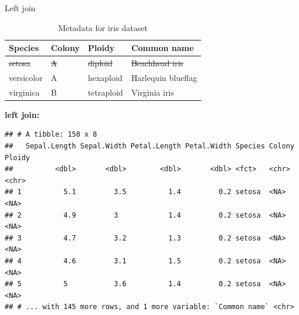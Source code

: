 \documentclass[14pt,ignorenonframetext,]{bredelebeamer}
\newenvironment{Shaded}{\begin{snugshade}}{\end{snugshade}}
\newcommand{\KeywordTok}[1]{\textcolor[rgb]{0.94,0.87,0.69}{#1}}
\newcommand{\DataTypeTok}[1]{\textcolor[rgb]{0.87,0.87,0.75}{#1}}
\newcommand{\DecValTok}[1]{\textcolor[rgb]{0.86,0.86,0.80}{#1}}
\newcommand{\StringTok}[1]{\textcolor[rgb]{0.80,0.58,0.58}{#1}}
\newcommand{\OperatorTok}[1]{\textcolor[rgb]{0.94,0.94,0.82}{#1}}
\newcommand{\NormalTok}[1]{\textcolor[rgb]{0.80,0.80,0.80}{#1}}
\begin{document}
\begin{frame}[fragile]{Left join}

\begin{table}[t]

\caption{\label{tab:unnamed-chunk-47}Metadata for iris dataset}
\centering
\begin{tabular}{llll}
\toprule
Species & Colony & Ploidy & Common name\\
\midrule
\rowcolor{gray!6}  \sout{setosa} & \sout{A} & \sout{diploid} & \sout{Beachhead iris}\\
versicolor & A & hexaploid & Harlequin blueflag\\
\rowcolor{gray!6}  virginica & B & tetraploid & Virginia iris\\
\bottomrule
\end{tabular}
\end{table}

\textbf{left join:}

\begin{Shaded}
\end{Shaded}

\begin{verbatim}
## # A tibble: 150 x 8
##   Sepal.Length Sepal.Width Petal.Length Petal.Width Species Colony Ploidy
##          <dbl>       <dbl>        <dbl>       <dbl> <fct>   <chr>  <chr> 
## 1          5.1         3.5          1.4         0.2 setosa  <NA>   <NA>  
## 2          4.9         3            1.4         0.2 setosa  <NA>   <NA>  
## 3          4.7         3.2          1.3         0.2 setosa  <NA>   <NA>  
## 4          4.6         3.1          1.5         0.2 setosa  <NA>   <NA>  
## 5          5           3.6          1.4         0.2 setosa  <NA>   <NA>  
## # ... with 145 more rows, and 1 more variable: `Common name` <chr>
\end{verbatim}

\end{frame}
\end{document}

